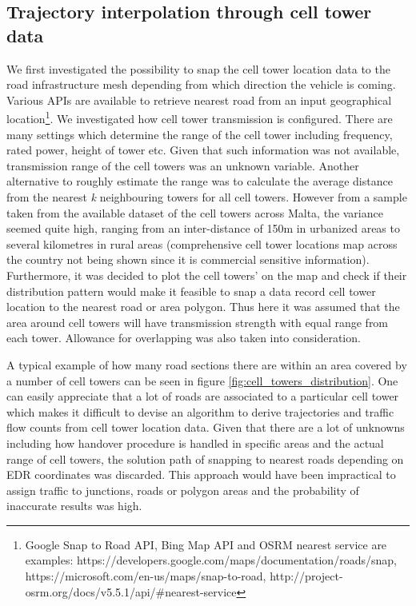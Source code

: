 \documentclass[12pt, a4paper]{report}
\theoremstyle{definition}
\theoremstyle{definition}%
\theoremstyle{definition}%
\theoremstyle{definition}%
\theoremstyle{definition}%
\theoremstyle{definition}%
\begin{document}
\subsection{Trajectory interpolation through cell tower data} \label{subsection:methodology:trajectory_interpolation}
We first investigated the possibility to snap the cell tower location data to the road infrastructure mesh depending from which direction the vehicle is coming. Various APIs are available to retrieve nearest road from an input geographical location\footnote{Google Snap to Road API, Bing Map API and OSRM nearest service are examples: https://developers.google.com/maps/documentation/roads/snap, https://microsoft.com/en-us/maps/snap-to-road, http://project-osrm.org/docs/v5.5.1/api/\#nearest-service}. We investigated how cell tower transmission is configured. There are many settings which determine the range of the cell tower including frequency, rated power, height of tower etc. Given that such information was not available, transmission range of the cell towers was an unknown variable. Another alternative to roughly estimate the range was to calculate the average distance from the nearest \textit{k} neighbouring towers for all cell towers. However from a sample taken from the available dataset of the cell towers across Malta, the variance seemed quite high, ranging from an inter-distance of 150m in urbanized areas to several kilometres in rural areas (comprehensive cell tower locations map across the country not being shown since it is  commercial sensitive information). Furthermore, it was decided to plot the cell towers' on the map and check if their distribution pattern would make it feasible to snap a data record cell tower location to the nearest road or area polygon. Thus here it was assumed that the area around cell towers will have transmission strength with equal range from each tower. Allowance for overlapping was also taken into consideration. 

A typical example of how many road sections there are within an area covered by a number of cell towers can be seen in figure \ref{fig:cell_towers_distribution}. One can easily appreciate that a lot of roads are associated to a particular cell tower which makes it difficult to devise an algorithm to derive trajectories and traffic flow counts from cell tower location data. Given that there are a lot of unknowns including how handover procedure is handled in specific areas and the actual range of cell towers, the solution path of snapping to nearest roads depending on EDR coordinates was discarded. This approach would have been impractical to assign traffic to junctions, roads or polygon areas and the probability of inaccurate results was high.
\end{document}
